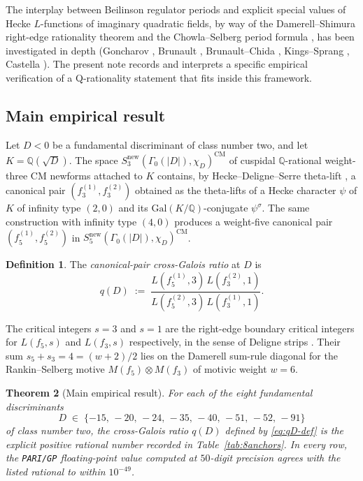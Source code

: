 \documentclass[11pt,a4paper]{amsart}
\theoremstyle{plain}
\newtheorem{theorem}{Theorem}[section]
\theoremstyle{definition}
\newtheorem{definition}[theorem]{Definition}
\newcommand{\Q}{\mathbb{Q}}
\newcommand{\Gal}{\mathrm{Gal}}
\newcommand{\eqdef}{:=}
\begin{document}
The interplay between Beilinson regulator periods and explicit special
values of Hecke $L$-functions of imaginary quadratic fields, by way of the
Damerell--Shimura right-edge rationality theorem
\cite{Damerell1971a,Shimura1976} and the Chowla--Selberg period formula
\cite{ChowlaSelberg1949}, has been investigated in depth
(Goncharov \cite{Goncharov1996}, Brunault \cite{Brunault2007},
Brunault--Chida \cite{BrunaultChida2015},
Kings--Sprang \cite{KingsSprang2025}, Castella \cite{Castella2024}).
The present note records and interprets a specific empirical
verification of a Q-rationality statement that fits inside this framework.

\subsection{Main empirical result}

Let $D<0$ be a fundamental discriminant of class number two, and let
$K = \Q(\sqrt{D})$. The space
$S_3^{\mathrm{new}}(\Gamma_0(|D|), \chi_D)^{\mathrm{CM}}$ of cuspidal
$\Q$-rational weight-three CM newforms attached to $K$ contains, by
Hecke--Deligne--Serre theta-lift \cite{Deligne1971,Serre1977,Ribet1977},
a canonical pair $(f_3^{(1)}, f_3^{(2)})$ obtained as the theta-lifts of
a Hecke character $\psi$ of $K$ of infinity type $(2,0)$ and its
$\Gal(K/\Q)$-conjugate $\psi^\sigma$. The same construction with
infinity type $(4,0)$ produces a weight-five canonical pair
$(f_5^{(1)}, f_5^{(2)})$ in
$S_5^{\mathrm{new}}(\Gamma_0(|D|), \chi_D)^{\mathrm{CM}}$.

\begin{definition}\label{def:qD}
The \emph{canonical-pair cross-Galois ratio} at $D$ is
\begin{equation}\label{eq:qD-def}
  q(D) \;\eqdef\;
  \frac{L(f_5^{(1)}, 3)\, L(f_3^{(2)}, 1)}{L(f_5^{(2)}, 3)\, L(f_3^{(1)}, 1)}.
\end{equation}
\end{definition}

The critical integers $s = 3$ and $s = 1$ are the right-edge boundary
critical integers for $L(f_5, s)$ and $L(f_3, s)$ respectively, in the
sense of Deligne strips \cite{Deligne1979}. Their sum
$s_5 + s_3 = 4 = (w+2)/2$ lies on the Damerell sum-rule diagonal for
the Rankin--Selberg motive
$M(f_5) \otimes M(f_3)$ of motivic weight $w = 6$.

\begin{theorem}[Main empirical result]\label{thm:main}
For each of the eight fundamental discriminants
\[
  D \;\in\; \{-15,\,-20,\,-24,\,-35,\,-40,\,-51,\,-52,\,-91\}
\]
of class number two, the cross-Galois ratio $q(D)$ defined by
\eqref{eq:qD-def} is the explicit positive rational number recorded in
Table~\ref{tab:8anchors}. In every row, the \texttt{PARI/GP} floating-point
value computed at $50$-digit precision agrees with the listed rational
to within $10^{-49}$.
\end{theorem}
\end{document}
